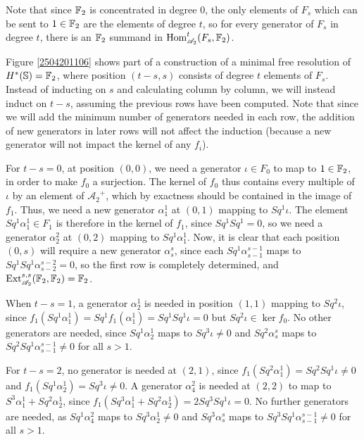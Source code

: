 \documentclass[11pt, titlepage]{article} %
\def\bb{\ensuremath\mathbb}
\def\A{\ensuremath{\mathscr{A}_2}}
\DeclareMathOperator{\Ext}{Ext}
\DeclareMathOperator{\Hom}{Hom}
\numberwithin{equation}{subsection}
\theoremstyle{plain}
\theoremstyle{definition}
\begin{document}
Note that since \(\bb{F}_2\) is concentrated in degree 0, the only elements of \(F_s\) which can be sent to \(1 \in \bb{F}_2\) are the elements of degree \(t\), so for every generator of \(F_s\) in degree \(t\), there is an \(\bb{F}_2\) summand in \(\Hom^t_{\A}(F_s, \bb{F}_2)\). 

Figure \ref{2504201106} shows part of a construction of a minimal free resolution of \(H^*(\bb{S})=\bb{F}_2\), where position \((t-s, s)\) consists of degree \(t\) elements of \(F_s\).  Instead of inducting on \(s\) and calculating column by column, we will instead induct on \(t-s\), assuming the previous rows have been computed. Note that since we will add the minimum number of generators needed in each row, the addition of new generators in later rows will not affect the induction (because a new generator will not impact the kernel of any \(f_i\)). 

For \(t-s=0\), at position \((0,0)\), we need a generator \(\iota\in F_0\) to map to \(1 \in \bb{F}_2\), in order to make \(f_0\) a surjection. The kernel of \(f_0\) thus contains every multiple of \(\iota\) by an element of \(\A^+\), which by exactness should be contained in the image of \(f_1\). Thus, we need a new generator \(\alpha^1_1\) at \((0,1)\) mapping to \(Sq^1\iota\). The element \(Sq^1\alpha^1_1\in F_1\) is therefore in the kernel of \(f_1\), since \(Sq^1Sq^1=0\), so we need a generator \(\alpha^2_2\) at \((0,2)\) mapping to \(Sq^1\alpha^1_1\). Now, it is clear that each position \((0,s)\) will require a new generator \(\alpha^s_s\), since each \(Sq^1\alpha^{s-1}_{s-1}\) maps to \(Sq^1Sq^1 \alpha^{s-2}_{s-2}=0\), so the first row is completely determined, and \(\Ext^{s,s}_{\A}(\bb{F}_2, \bb{F}_2)=\bb{F}_2\). 

When \(t-s=1\), a generator \(\alpha^1_2\) is needed in position \((1,1)\) mapping to \(Sq^2\iota\), since \(f_1(Sq^1\alpha^1_1)=Sq^1f_1(\alpha^1_1)=Sq^1
Sq^1\iota=0\) but \(Sq^2\iota\in \ker f_0\). No other generators are needed, since \(Sq^1\alpha^1_2\) maps to \(Sq^3\iota\neq 0\) and \(Sq^2\alpha^s_s\) maps to \(Sq^2Sq^1\alpha^{s-1}_{s-1}\neq 0\) for all \(s>1\).

For \(t-s=2\), no generator is needed at \((2,1)\), since \(f_1(Sq^2\alpha^1_1)=Sq^2Sq^1\iota\neq 0\) and \(f_1(Sq^1\alpha^1_2)=Sq^3\iota\neq 0\). A generator \(\alpha^2_4\) is needed at \((2, 2)\) to map to \(S^3\alpha^1_1+Sq^2\alpha^1_2\), since \(f_1(Sq^3\alpha^1_1+Sq^2\alpha^1_2)=2Sq^3 Sq^1\iota=0\). No further generators are needed, as \(Sq^1\alpha^2_4\) maps to \(Sq^3\alpha^1_2\neq 0\) and \(Sq^3\alpha^s_s\) maps to \(Sq^3Sq^1\alpha^{s-1}_{s-1}\neq 0\) for all \(s>1\).
\end{document}
